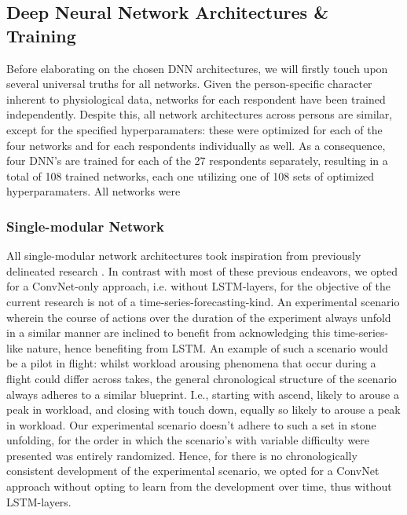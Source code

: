\documentclass[12pt]{article}
\begin{document}
\subsection{Deep Neural Network Architectures \& Training} \label{section:DNN}
Before elaborating on the chosen DNN architectures, we will firstly touch upon several universal truths for all networks.  Given the person-specific character inherent to physiological data,  networks for each respondent have been trained independently. Despite this, all network architectures across persons are similar, except for the specified hyperparamaters: these were optimized for each of the four networks and for each respondents individually as well. As a consequence, four DNN's are trained for each of the 27 respondents separately, resulting in a total of 108 trained networks, each one utilizing one of 108 sets of optimized hyperparamaters. All networks were 

\subsubsection{Single-modular Network}
All single-modular network architectures took inspiration from previously delineated research \cite{schirrmeister2017deep} \cite{dolmans2020perceived} \cite{sun2019hybrid} \cite{biswas2019cornet}. In contrast with most of these previous endeavors, we opted for a ConvNet-only approach, i.e. without LSTM-layers, for the objective of the current research is not of a time-series-forecasting-kind. An experimental scenario wherein the course of actions over the duration of the experiment always unfold in a similar manner are inclined to benefit from acknowledging this time-series-like nature, hence benefiting from LSTM. An example of such a scenario would be a pilot in flight: whilst workload arousing phenomena that occur during a flight could differ across takes, the general chronological structure of the scenario always adheres to a similar blueprint. I.e., starting with ascend, likely to arouse a peak in workload, and closing with touch down, equally so likely to arouse a peak in workload. Our experimental scenario doesn't adhere to such a set in stone unfolding, for the order in which the scenario's with variable difficulty were presented was entirely randomized.  Hence, for there is no chronologically consistent development of the experimental scenario, we opted for a ConvNet approach without opting to learn from the development over time, thus without LSTM-layers.  
\end{document}
